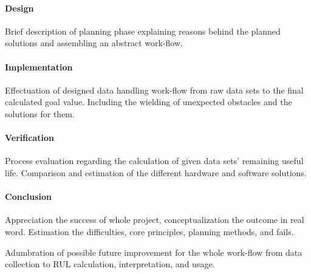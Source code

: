 		\paragraph{Design}

Brief description of planning phase explaining reasons behind the planned solutions and assembling an abstract work-flow.

		\paragraph{Implementation}

Effectuation of designed data handling work-flow from raw data sets to the final calculated goal value. Including the wielding of unexpected obstacles and the solutions for them.

		\paragraph{Verification}

Process evaluation regarding the calculation of given data sets' remaining useful life. Comparison and estimation of the different hardware and software solutions.

		\paragraph{Conclusion}

Appreciation the success of whole project, conceptualization the outcome in real word. Estimation the difficulties, core principles, planning methods, and fails.

Adumbration of possible future improvement for the whole work-flow from data collection to RUL calculation, interpretation, and usage.

